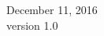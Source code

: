 \begin{titlepage}


{\large December 11, 2016}\\[0.5cm] %
{\large version 1.0}\\[2cm]
 

\vfill %
\clearpage
\end{titlepage}
